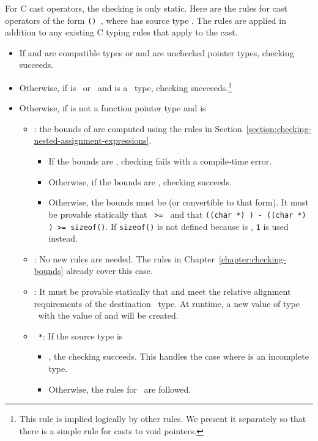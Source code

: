 For C cast operators, the checking is only static.
Here are the rules for cast operators of the form \texttt{() },
where  has source type .  The rules are applied in addition
to any existing C typing rules that apply to the cast.
\begin{itemize}
\item If  and  are compatible types or  and  are unchecked
pointer types, checking succeeds.

\item Otherwise, if  is \ptrvoid\ or \uncheckedptrvoid\ and  is a \ptr\ type,
checking succceeds.\footnote{This rule is implied logically by other rules.   We present
it separately so that there is a simple rule for casts to void pointers.}
\item Otherwise, if  is not a function pointer type and  is
\begin{itemize}
\item \ptrT: the bounds of  are computed using the rules
in Section~\ref{section:checking-nested-assignment-expressions}.
\begin{itemize}
\item If the bounds are \boundsnone, checking fails with a compile-time
error.
\item Otherwise, if the bounds are \boundsany, checking 
succeeds.
\item Otherwise, the bounds must be  (or convertible
to that form).  It must be provable statically that \texttt{ >= }
and that {\texttt{((char *) ) - ((char *) ) >= sizeof()}}.
If \texttt{sizeof()} is not defined because  is \void, \texttt{1} is
used instead.
\end{itemize}
\item \arrayptrT: No new rules are needed.   The rules in
Chapter~\ref{chapter:checking-bounds} already cover this case.
\item \spanptrT: It must be provable statically that 
and  meet the relative alignment requirements of
the destination \spanptr\ type.  At runtime, a new value of
type \spanptrT\ with the value of  and  will be created.
\item \texttt{ *}: If the source type  is
\begin{itemize}
\item \ptrT, the checking succeeds. This handles the case where 
is an incomplete type.
\item Otherwise, the rules for \ptrT\ are followed.
\end{itemize}
\end{itemize}


\end{itemize}
